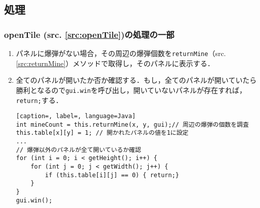 \documentclass[a4j,11pt]{jsarticle}
\newcommand{\srcref}[1]{src. \ref{#1}}
\newcommand{\met}[1]{\ttfamily #1 \normalfont (\srcref{src:#1})の処理}
\begin{document}
\subsection{処理}\label{sec:openTile}
\subsubsection*{\met{openTile}の一部}
\begin{enumerate}
    \renewcommand{\labelenumi}{\arabic{enumi})}
    \item パネルに爆弾がない場合，その周辺の爆弾個数を{\verb|returnMine|}（\srcref{src:returnMine}）メソッドで取得し，そのパネルに表示する．
    \item 全てのパネルが開いたか否か確認する．もし，全てのパネルが開いていたら勝利となるので{\verb|gui.win|}を呼び出し，開いていないパネルが存在すれば，{\verb|return;|}する．
          \begin{lstlisting}[caption=, label=, language=Java]
int mineCount = this.returnMine(x, y, gui);// 周辺の爆弾の個数を調査
this.table[x][y] = 1; // 開かれたパネルの値を1に設定
...
// 爆弾以外のパネルが全て開いているか確認
for (int i = 0; i < getHeight(); i++) {
    for (int j = 0; j < getWidth(); j++) {
        if (this.table[i][j] == 0) { return;}
    }
}
gui.win();
\end{lstlisting}
\end{enumerate}
\newpage
\end{document}

